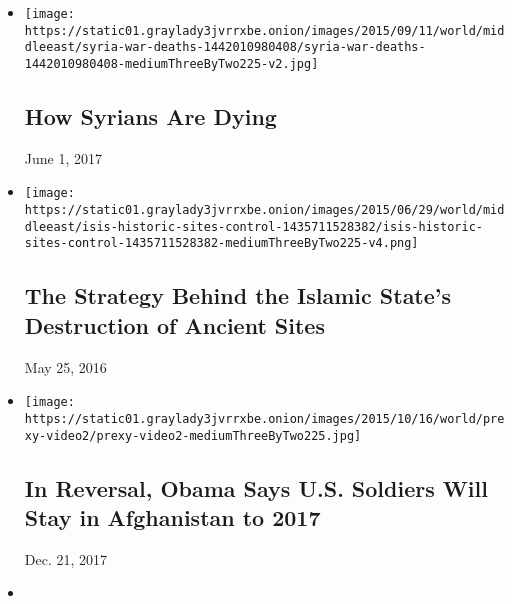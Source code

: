 \begin{itemize}
\item
  \href{https://www.nytimes3xbfgragh.onion/interactive/2015/09/14/world/middleeast/syria-war-deaths.html}{}

  \texttt{[image: https://static01.graylady3jvrrxbe.onion/images/2015/09/11/world/middleeast/syria-war-deaths-1442010980408/syria-war-deaths-1442010980408-mediumThreeByTwo225-v2.jpg]}

  \hypertarget{how-syrians-are-dying}{%
  \subsection{How Syrians Are Dying}\label{how-syrians-are-dying}}

  June 1, 2017
\item
  \href{https://www.nytimes3xbfgragh.onion/interactive/2015/06/29/world/middleeast/isis-historic-sites-control.html}{}

  \texttt{[image: https://static01.graylady3jvrrxbe.onion/images/2015/06/29/world/middleeast/isis-historic-sites-control-1435711528382/isis-historic-sites-control-1435711528382-mediumThreeByTwo225-v4.png]}

  \hypertarget{the-strategy-behind-the-islamic-states-destruction-of-ancient-sites}{%
  \subsection{The Strategy Behind the Islamic State's Destruction of
  Ancient
  Sites}\label{the-strategy-behind-the-islamic-states-destruction-of-ancient-sites}}

  May 25, 2016
\item
  \href{https://www.nytimes3xbfgragh.onion/2015/10/16/world/asia/obama-troop-withdrawal-afghanistan.html}{}

  \texttt{[image: https://static01.graylady3jvrrxbe.onion/images/2015/10/16/world/prexy-video2/prexy-video2-mediumThreeByTwo225.jpg]}

  \hypertarget{in-reversal-obama-says-us-soldiers-will-stay-in-afghanistan-to-2017}{%
  \subsection{In Reversal, Obama Says U.S. Soldiers Will Stay in
  Afghanistan to
  2017}\label{in-reversal-obama-says-us-soldiers-will-stay-in-afghanistan-to-2017}}

  Dec. 21, 2017
\item
  \href{https://www.nytimes3xbfgragh.onion/2015/10/04/world/asia/afghanistan-bombing-hospital-doctors-without-borders-kunduz.html}{}


\end{itemize}
